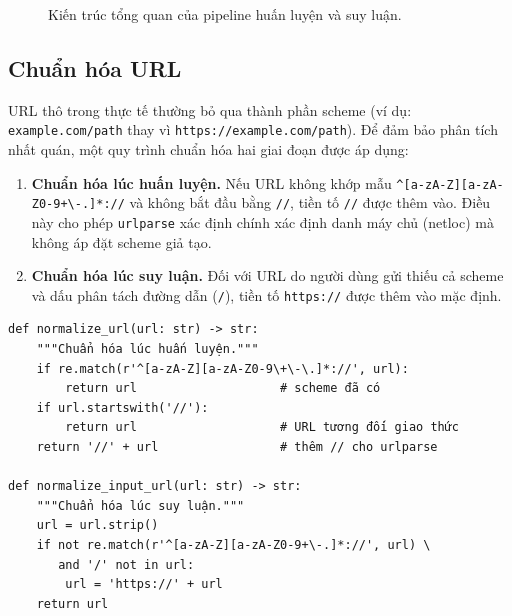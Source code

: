 \documentclass[a4paper,12pt]{article}
\begin{document}
\begin{figure}[H]
\caption{Kiến trúc tổng quan của pipeline huấn luyện và suy luận.}
\label{fig:pipeline}
\end{figure}

\subsection{Chuẩn hóa URL}

URL thô trong thực tế thường bỏ qua thành phần scheme (ví dụ: \texttt{example.com/path} thay vì \texttt{https://example.com/path}). Để đảm bảo phân tích nhất quán, một quy trình chuẩn hóa hai giai đoạn được áp dụng:

\begin{enumerate}
    \item \textbf{Chuẩn hóa lúc huấn luyện.} Nếu URL không khớp mẫu \verb|^[a-zA-Z][a-zA-Z0-9+\-.]*://| và không bắt đầu bằng \texttt{//}, tiền tố \texttt{//} được thêm vào. Điều này cho phép \texttt{urlparse} xác định chính xác định danh máy chủ (netloc) mà không áp đặt scheme giả tạo.
    \item \textbf{Chuẩn hóa lúc suy luận.} Đối với URL do người dùng gửi thiếu cả scheme và dấu phân tách đường dẫn (\texttt{/}), tiền tố \texttt{https://} được thêm vào mặc định.
\end{enumerate}

\begin{lstlisting}[caption={Các hàm chuẩn hóa URL}]
def normalize_url(url: str) -> str:
    """Chuẩn hóa lúc huấn luyện."""
    if re.match(r'^[a-zA-Z][a-zA-Z0-9\+\-\.]*://', url):
        return url                    # scheme đã có
    if url.startswith('//'):
        return url                    # URL tương đối giao thức
    return '//' + url                 # thêm // cho urlparse

def normalize_input_url(url: str) -> str:
    """Chuẩn hóa lúc suy luận."""
    url = url.strip()
    if not re.match(r'^[a-zA-Z][a-zA-Z0-9+\-.]*://', url) \
       and '/' not in url:
        url = 'https://' + url
    return url
\end{lstlisting}
\end{document}
